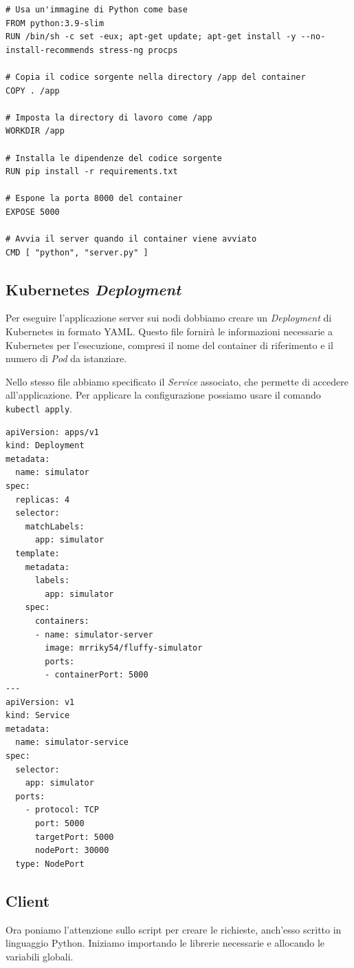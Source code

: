 \documentclass[12pt, hidelinks]{report}
\begin{document}
\begin{lstlisting}
# Usa un'immagine di Python come base
FROM python:3.9-slim
RUN /bin/sh -c set -eux; apt-get update; apt-get install -y --no-install-recommends stress-ng procps 

# Copia il codice sorgente nella directory /app del container
COPY . /app

# Imposta la directory di lavoro come /app
WORKDIR /app

# Installa le dipendenze del codice sorgente
RUN pip install -r requirements.txt

# Espone la porta 8000 del container
EXPOSE 5000

# Avvia il server quando il container viene avviato
CMD [ "python", "server.py" ]
\end{lstlisting}

\subsection{Kubernetes \textit{Deployment}}
Per eseguire l'applicazione server sui nodi dobbiamo creare un \textit{Deployment} di Kubernetes in formato YAML. Questo file fornirà le informazioni necessarie a Kubernetes per l'esecuzione, compresi il nome del container di riferimento e il numero di \textit{Pod} da istanziare. 

Nello stesso file abbiamo specificato il \textit{Service} associato, che permette di accedere all'applicazione. Per applicare la configurazione possiamo usare il comando \texttt{kubectl apply}.

\begin{lstlisting}
apiVersion: apps/v1
kind: Deployment
metadata:
  name: simulator
spec:
  replicas: 4
  selector:
    matchLabels:
      app: simulator
  template:
    metadata:
      labels:
        app: simulator
    spec:
      containers:
      - name: simulator-server
        image: mrriky54/fluffy-simulator
        ports:
        - containerPort: 5000
---
apiVersion: v1
kind: Service
metadata:
  name: simulator-service
spec:
  selector:
    app: simulator
  ports:
    - protocol: TCP
      port: 5000
      targetPort: 5000
      nodePort: 30000
  type: NodePort
\end{lstlisting}

\subsection{Client}
Ora poniamo l'attenzione sullo script per creare le richieste, anch'esso scritto in linguaggio Python. Iniziamo importando le librerie necessarie e allocando le variabili globali.
\end{document}
